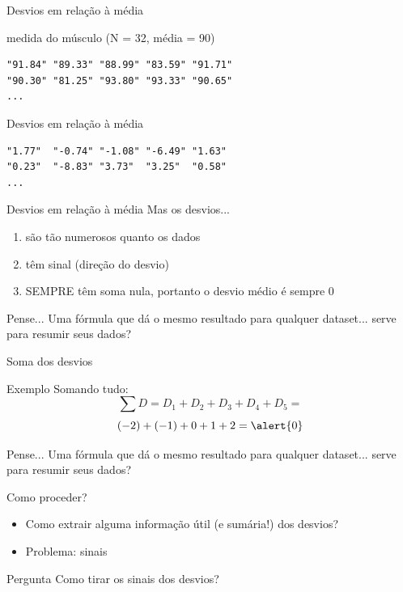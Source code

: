 \documentclass{beamer}
\begin{document}
\begin{frame}[fragile]{Desvios em relação à média}
  \begin{block}{medida do músculo (N = 32, média = 90)}
\begin{verbatim}
"91.84" "89.33" "88.99" "83.59" "91.71"
"90.30" "81.25" "93.80" "93.33" "90.65"
...
\end{verbatim}
  \end{block}
  \begin{block}{Desvios em relação à média}
\begin{verbatim}
"1.77"  "-0.74" "-1.08" "-6.49" "1.63"
"0.23"  "-8.83" "3.73"  "3.25"  "0.58"
...
\end{verbatim}
  \end{block}
\end{frame}

\begin{frame}{Desvios em relação à média}
  Mas os desvios...
  \begin{enumerate}
  \item são tão numerosos quanto os dados
  \item têm sinal (direção do desvio)
  \item SEMPRE têm soma \alert{nula}, portanto o desvio médio é sempre 0
  \end{enumerate}
  \begin{block}{Pense...}
    Uma fórmula que dá o mesmo resultado para qualquer dataset... serve para resumir seus dados?
  \end{block}
\end{frame}

\begin{frame}{Soma dos desvios}
  \begin{exampleblock}{Exemplo}
    Somando tudo:
    \begin{displaymath}
    \sum D = D_1 + D_2 + D_3 + D_4 + D_5 =
  \end{displaymath}
  \begin{displaymath}
    (-2) + (-1) + 0 + 1 + 2 = \alert{0}
  \end{displaymath}
  \end{exampleblock}
  \begin{block}{Pense...}
    Uma fórmula que dá o mesmo resultado para qualquer dataset... serve para resumir seus dados?
  \end{block}
\end{frame}

\begin{frame}{Como proceder?}
  \begin{itemize}
  \item Como extrair alguma informação útil (e sumária!) dos desvios?
  \item Problema: sinais
  \end{itemize}
  \begin{block}{Pergunta}
    Como tirar os sinais dos desvios?
  \end{block}
\end{frame}
\end{document}
